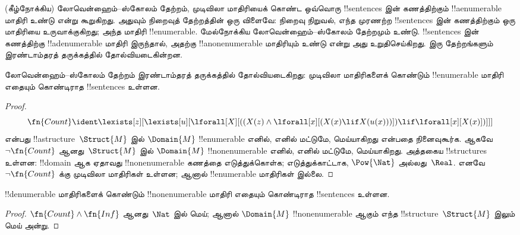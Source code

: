 \documentclass[../../../include/open-logic-section]{subfiles}
\begin{document}



\begin{explain}
(கீழ்நோக்கிய) லோவென்ஹைம்--ஸ்கோலம் தேற்றம், முடிவிலா மாதிரியைக்
கொண்ட ஒவ்வொரு !!{sentence}s இன் கணத்திற்கும் !!a{enumerable}
மாதிரி உண்டு என்று கூறுகிறது. அதுவும் நிறைவுத் தேற்றத்தின் ஒரு
விளைவே: நிறைவு நிறுவல், எந்த முரணற்ற !!{sentence}s இன் கணத்திற்கும்
ஒரு மாதிரியை உருவாக்குகிறது; அந்த மாதிரி !!{enumerable}. மேல்நோக்கிய
லோவென்ஹைம்--ஸ்கோலம் தேற்றமும் உண்டு. !!{sentence}s இன் கணத்திற்கு
!!a{denumerable} மாதிரி இருந்தால், அதற்கு !!a{nonenumerable}
மாதிரியும் உண்டு என்று அது உறுதிசெய்கிறது. இரு தேற்றங்களும்
இரண்டாம்தரத் தருக்கத்தில் தோல்வியடைகின்றன.
\end{explain}

\begin{thm}
 லோவென்ஹைம்--ஸ்கோலம் தேற்றம் இரண்டாம்தரத்
தருக்கத்தில் தோல்வியடைகிறது: முடிவிலா மாதிரிகளைக் கொண்டும்
!!{enumerable} மாதிரி எதையும் கொண்டிராத !!{sentence}s உள்ளன.
\end{thm}

\begin{proof}
\[
\fn{Count} \ident \lexists[z][\lexists[u][\lforall[X][((X(z) \land
      \lforall[x][(X(x) \lif X(u(x)))]) \lif \lforall[x][X(x)])]]]
\]
என்பது !!a{structure}~$\Struct{M}$ இல் $\Domain{M}$
!!{enumerable} எனில், எனில் மட்டுமே, மெய்யாகிறது என்பதை நினைவுகூர்க.
ஆகவே~$\lnot\fn{Count}$ ஆனது~$\Struct{M}$ இல்
$\Domain{M}$ !!{nonenumerable} எனில், எனில் மட்டுமே, மெய்யாகிறது.
அத்தகைய !!{structure}s உள்ளன: !!{domain} ஆக ஏதாவது
!!{nonenumerable} கணத்தை எடுத்துக்கொள்க; எடுத்துக்காட்டாக,
$\Pow{\Nat}$ அல்லது~$\Real$. எனவே~$\lnot \fn{Count}$ க்கு முடிவிலா
மாதிரிகள் உள்ளன; ஆனால் !!{enumerable} மாதிரிகள் இல்லை.
\end{proof}

\begin{thm}
!!{denumerable} மாதிரிகளைக் கொண்டும் !!{nonenumerable} மாதிரி
எதையும் கொண்டிராத !!{sentence}s உள்ளன.
\end{thm}

\begin{proof}
$\fn{Count} \land \fn{Inf}$ ஆனது~$\Nat$ இல் மெய்; ஆனால்
$\Domain{M}$ !!{nonenumerable} ஆகும் எந்த !!{structure}~$\Struct{M}$
இலும் மெய் அன்று.
\end{proof}
\end{document}
